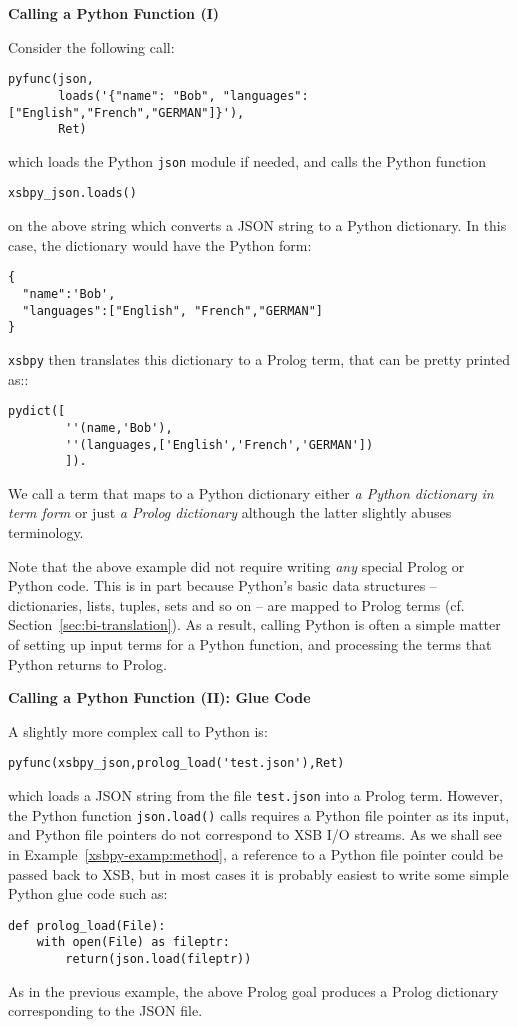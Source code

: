 \begin{example} \rm {\bf Calling a Python Function (I)}
  
\noindent  
Consider the following call:

 \begin{verbatim}
pyfunc(json,
       loads('{"name": "Bob", "languages": ["English","French","GERMAN"]}'),
       Ret)
\end{verbatim}
 
\noindent 
which loads the Python {\tt json} module if needed, and calls the
Python function

{\tt xsbpy\_json.loads()}

\noindent
on the above string which converts a JSON string to a Python
dictionary.  In this case, the dictionary would have the Python form:
\begin{verbatim}
{
  "name":'Bob',
  "languages":["English", "French","GERMAN"]
}
\end{verbatim}
{\tt xsbpy} then translates this dictionary to a Prolog term, that can
be pretty printed as::
\begin{verbatim}
pydict([
        ''(name,'Bob'),
        ''(languages,['English','French','GERMAN'])
        ]).
\end{verbatim}
We call a term that maps to a Python dictionary either {\em a Python
  dictionary in term form} or just {\em a Prolog dictionary} although
the latter slightly abuses terminology.
\end{example}

Note that the above example did not require writing {\em any} special
Prolog or Python code.  This is in part because Python's basic data
structures -- dictionaries, lists, tuples, sets and so on -- are
mapped to Prolog terms (cf. Section~\ref{sec:bi-translation}).  As a
result, calling Python is often a simple matter of setting up input
terms for a Python function, and processing the terms that Python
returns to Prolog.

\begin{example} \rm {\bf Calling a Python Function (II): Glue Code} \label{xsbpy-examp:glue}

\noindent
  A slightly more complex call to Python is:
 \begin{verbatim}
pyfunc(xsbpy_json,prolog_load('test.json'),Ret)
\end{verbatim}

\noindent
which loads a JSON string from the file {\tt test.json} into a Prolog
term.  However, the Python function {\tt json.load()} calls requires a
Python file pointer as its input, and Python file pointers do not
correspond to XSB I/O streams.  As we shall see in
Example~\ref{xsbpy-examp:method}, a reference to a Python file pointer
could be passed back to XSB, but in most cases it is probably easiest
to write some simple Python glue code such as:

\begin{verbatim}   
def prolog_load(File):
    with open(File) as fileptr:
        return(json.load(fileptr))
\end{verbatim}
\noindent
As in the previous example, the above Prolog goal produces a Prolog
dictionary corresponding to the JSON file.
\end{example}

